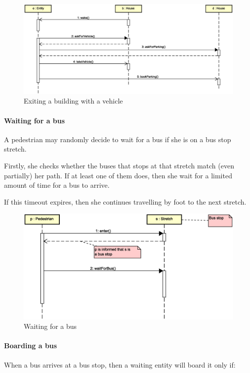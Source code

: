 \begin{figure}[H]
  \centering
  \includegraphics[width=\columnwidth,trim=1 0 0 0,clip]
    {sections/images/solution/going-out-vehicle.eps}
  \caption{Exiting a building with a vehicle}
  \label{fig:app-inter-vehicle}
\end{figure}

\paragraph{Waiting for a bus} A pedestrian may randomly decide to wait for a
bus if she is on a bus stop stretch.

Firstly, she checks whether the buses that stops at that stretch match (even
partially) her path. If at least one of them does, then she wait for a limited
amount of time for a bus to arrive.

If this timeout expires, then she continues travelling by foot to the next
stretch.

\begin{figure}[H]
  \centering
  \includegraphics[width=\columnwidth,trim=1 0 2 0,clip]
    {sections/images/solution/bus-waiting.eps}
  \caption{Waiting for a bus}
  \label{fig:app-inter-wait-bus}
\end{figure}

\paragraph{Boarding a bus} When a bus arrives at a bus stop, then a waiting
entity will board it only if:

